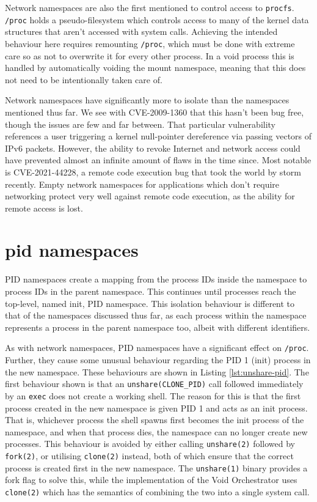 \documentclass[12pt,a4paper,twoside]{report}
\begin{document}
Network namespaces are also the first mentioned to control access to \texttt{procfs}. \texttt{/proc} holds a pseudo-filesystem which controls access to many of the kernel data structures that aren't accessed with system calls. Achieving the intended behaviour here requires remounting \texttt{/proc}, which must be done with extreme care so as not to overwrite it for every other process. In a void process this is handled by automatically voiding the mount namespace, meaning that this does not need to be intentionally taken care of.

Network namespaces have significantly more to isolate than the namespaces mentioned thus far. We see with CVE-2009-1360 that this hasn't been bug free, though the issues are few and far between. That particular vulnerability references a user triggering a kernel null-pointer dereference via passing vectors of IPv6 packets. However, the ability to revoke Internet and network access could have prevented almost an infinite amount of flaws in the time since. Most notable is CVE-2021-44228, a remote code execution bug that took the world by storm recently. Empty network namespaces for applications which don't require networking protect very well against remote code execution, as the ability for remote access is lost.

\section{pid namespaces}
\label{sec:voiding-pid}

PID namespaces create a mapping from the process IDs inside the namespace to process IDs in the parent namespace. This continues until processes reach the top-level, named init, PID namespace. This isolation behaviour is different to that of the namespaces discussed thus far, as each process within the namespace represents a process in the parent namespace too, albeit with different identifiers.

As with network namespaces, PID namespaces have a significant effect on \texttt{/proc}. Further, they cause some unusual behaviour regarding the PID 1 (init) process in the new namespace. These behaviours are shown in Listing \ref{lst:unshare-pid}. The first behaviour shown is that an \texttt{unshare(CLONE\_PID)} call followed immediately by an \texttt{exec} does not create a working shell. The reason for this is that the first process created in the new namespace is given PID 1 and acts as an init process. That is, whichever process the shell spawns first becomes the init process of the namespace, and when that process dies, the namespace can no longer create new processes. This behaviour is avoided by either calling \texttt{unshare(2)} followed by \texttt{fork(2)}, or utilising \texttt{clone(2)} instead, both of which ensure that the correct process is created first in the new namespace. The \texttt{unshare(1)} binary provides a fork flag to solve this, while the implementation of the Void Orchestrator uses \texttt{clone(2)} which has the semantics of combining the two into a single system call.
\end{document}
